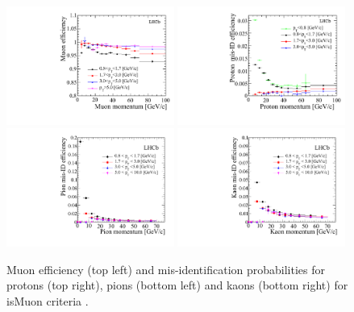 \begin{figure}[tbp] 
  \centering    
  \includegraphics[width=0.49\textwidth]{./Figs/LHC_LHCb/hidef_Fig41topleft.pdf}
  \includegraphics[width=0.49\textwidth]{./Figs/LHC_LHCb/hidef_Fig41topright.pdf}
  \includegraphics[width=0.49\textwidth]{./Figs/LHC_LHCb/hidef_Fig41bottomleft.pdf}
  \includegraphics[width=0.49\textwidth]{./Figs/LHC_LHCb/hidef_Fig41bottomright.pdf}
  \caption{Muon efficiency (top left) and mis-identification probabilities for protons (top right), pions (bottom left) and kaons (bottom right) for isMuon criteria \cite{Archilli:2013npa}. }
  \label{fig:isMuon_efficiency}
\end{figure}




